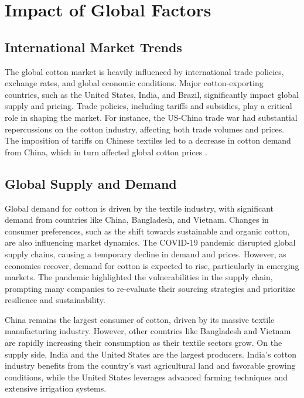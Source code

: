 \documentclass[12pt]{article}
\begin{document}
\section{Impact of Global Factors}

\subsection{International Market Trends}

The global cotton market is heavily influenced by international trade policies, exchange rates, and global economic conditions. Major cotton-exporting countries, such as the United States, India, and Brazil, significantly impact global supply and pricing. Trade policies, including tariffs and subsidies, play a critical role in shaping the market. For instance, the US-China trade war had substantial repercussions on the cotton industry, affecting both trade volumes and prices. The imposition of tariffs on Chinese textiles led to a decrease in cotton demand from China, which in turn affected global cotton prices \cite{usda2023, usda2022}.

\subsection{Global Supply and Demand}

Global demand for cotton is driven by the textile industry, with significant demand from countries like China, Bangladesh, and Vietnam. Changes in consumer preferences, such as the shift towards sustainable and organic cotton, are also influencing market dynamics. The COVID-19 pandemic disrupted global supply chains, causing a temporary decline in demand and prices. However, as economies recover, demand for cotton is expected to rise, particularly in emerging markets. The pandemic highlighted the vulnerabilities in the supply chain, prompting many companies to re-evaluate their sourcing strategies and prioritize resilience and sustainability.

China remains the largest consumer of cotton, driven by its massive textile manufacturing industry. However, other countries like Bangladesh and Vietnam are rapidly increasing their consumption as their textile sectors grow. On the supply side, India and the United States are the largest producers. India’s cotton industry benefits from the country's vast agricultural land and favorable growing conditions, while the United States leverages advanced farming techniques and extensive irrigation systems.
\end{document}
